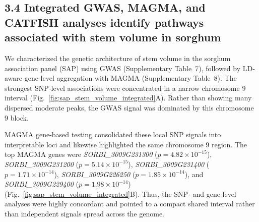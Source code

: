 \documentclass[unnumsec,webpdf,contemporary,large]{oup-authoring-template}%
\theoremstyle{thmstyleone}%
\theoremstyle{thmstyletwo}%
\theoremstyle{thmstylethree}%
\begin{document}
\subsection*{3.4 Integrated GWAS, MAGMA, and CATFISH analyses identify pathways associated with stem volume in sorghum}

We characterized the genetic architecture of stem volume in the sorghum association panel (SAP) using GWAS (Supplementary Table~7), followed by LD-aware gene-level aggregation with MAGMA (Supplementary Table~8). The strongest SNP-level associations were concentrated in a narrow chromosome 9 interval (Fig.~\ref{fig:sap_stem_volume_integrated}A). Rather than showing many dispersed moderate peaks, the GWAS signal was dominated by this chromosome 9 block.

MAGMA gene-based testing consolidated these local SNP signals into interpretable loci and likewise highlighted the same chromosome 9 region. The top MAGMA genes were \textit{SORBI\_3009G231300} ($p = 4.82 \times 10^{-15}$), \textit{SORBI\_3009G231200} ($p = 5.14 \times 10^{-15}$), \textit{SORBI\_3009G231400} ($p = 1.71 \times 10^{-14}$), \textit{SORBI\_3009G226250} ($p = 1.85 \times 10^{-14}$), and \textit{SORBI\_3009G229400} ($p = 1.98 \times 10^{-14}$) (Fig.~\ref{fig:sap_stem_volume_integrated}B). Thus, the SNP- and gene-level analyses were highly concordant and pointed to a compact shared interval rather than independent signals spread across the genome.
\end{document}
